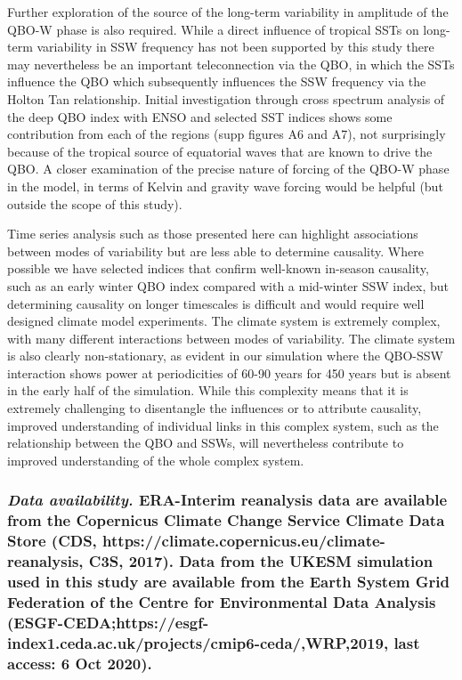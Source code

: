 \documentclass[wcd, manuscript]{copernicus}
\begin{document}
Further exploration of the source of the long-term variability in amplitude of the QBO-W phase is also required. While a direct influence of tropical SSTs on long-term variability in SSW frequency has not been supported by this study there may nevertheless be an important teleconnection via the QBO, in which the SSTs influence the QBO which subsequently influences the SSW frequency via the Holton Tan relationship. Initial investigation through cross spectrum analysis of the deep QBO index with ENSO and selected SST indices shows some contribution from each of the regions (supp figures A6 and A7), not surprisingly because of the tropical source of equatorial waves that are known to drive the QBO. A closer examination of the precise nature of forcing of the QBO-W phase in the model, in terms of Kelvin and gravity wave forcing would be helpful (but outside the scope of this study). 

Time series analysis such as those presented here can highlight associations between modes of variability but are less able to determine causality. Where possible we have selected indices that confirm well-known in-season causality, such as an early winter QBO index compared with a mid-winter SSW index, but determining causality on longer timescales is  difficult and would require well designed climate model experiments. The climate system is extremely complex, with many different interactions between modes of variability. The climate system is also clearly non-stationary, as evident in our simulation where the QBO-SSW interaction shows power at periodicities of 60-90 years for 450 years but is absent in the early half of the simulation. While this complexity means that it is extremely challenging to disentangle the influences or to attribute causality, improved understanding of individual links in this complex system, such as the relationship between the QBO and SSWs, will nevertheless contribute to improved understanding of the whole complex system.   


\subsubsection*{\normalsize\normalfont\textit{Data availability. }ERA-Interim reanalysis data are available from the Copernicus Climate Change Service Climate Data Store \newline(CDS, https://climate.copernicus.eu/climate-reanalysis,
C3S, 2017). Data from the UKESM simulation used in this study are available from the Earth System Grid Federation of the Centre for Environmental Data Analysis (ESGF-CEDA;https://esgf-index1.ceda.ac.uk/projects/cmip6-ceda/,WRP,2019, last access: 6 Oct 2020).}
\end{document}
